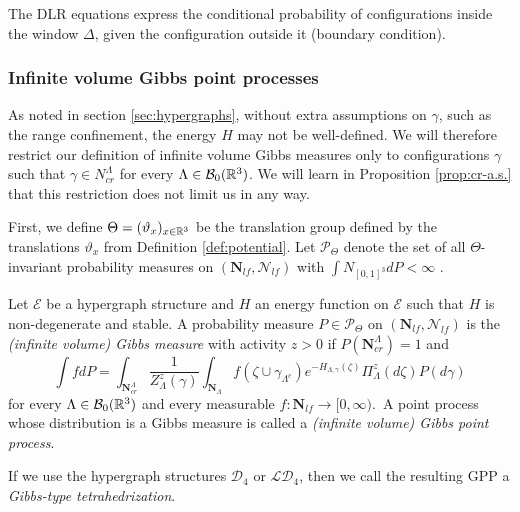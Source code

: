 The DLR equations express the conditional probability of configurations inside the window $\Delta$, given the configuration outside it (boundary condition).



\subsubsection{Infinite volume Gibbs point processes}
As noted in section \ref{sec:hypergraphs}, without extra assumptions on $\gamma$, such as the range confinement, the energy $H$ may not be well-defined. We will therefore restrict our definition of infinite volume Gibbs measures only to configurations $\gamma$ such that $\gamma \in N^\Lambda_{cr}$ for every $\Lambda \in \mathcal B_0({\mathbb R^3})$. We will learn in Proposition \ref{prop:cr-a.s.} that this restriction does not limit us in any way.

First, we define $\Theta=(\vartheta_x)_{x\in {\mathbb R^3}}$ be the translation group defined by the translations $\vartheta_x$ from Definition \ref{def:potential}. Let $\mathcal P_\Theta$ denote the set of all $\Theta$-invariant probability measures on $(\mathbf N_{lf},\mathcal N_{lf})$ with $\int N_{[0,1]^3} dP< \infty $ . 

\begin{definition}\label{def:GPP}
	Let $\mathcal E$ be a hypergraph structure and $H$ an energy function on $\mathcal E$ such that $H$ is non-degenerate and stable. A probability measure $P\in \mathcal P_\Theta$ on $(\mathbf N_{lf},\mathcal N_{lf})$ is the \textit{(infinite volume) Gibbs measure} with activity $z>0$ if $P(\mathbf N^\Lambda_{cr})=1$ and
	\begin{equation}\label{eq:DLR}
		\int f dP = \int_{\mathbf N^\Lambda_{cr}} \frac 1 {Z^z_{\Lambda}(\gamma)} \int_{\mathbf N_\Lambda} f(\zeta \cup \gamma_{\Lambda^c}) e^{-H_{\Lambda,\gamma}(\zeta)} \Pi^z_\Lambda (d\zeta) P(d\gamma)
	\end{equation}
		for every $\Lambda \in \mathcal B_0({\mathbb R^3})$ and every measurable $f:\mathbf N_{lf} \to [0,\infty)$.\
		A point process whose distribution is a Gibbs measure is called a \textit{(infinite volume) Gibbs point process}.
\end{definition}
If we use the hypergraph structures $\mathcal D_4$ or $\mathcal {LD}_4$, then we call the resulting GPP a \textit{Gibbs-type tetrahedrization}. 

